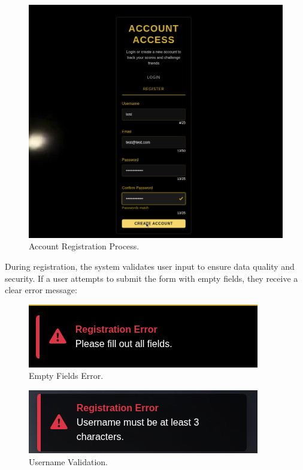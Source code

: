\begin{figure}[H]
    \centering
    \includegraphics[width=0.7\linewidth]{Figures/images/new_images/RegisteringAccount.png}
    \caption{Account Registration Process.} %
    \label{fig:registering-account}
\end{figure}

During registration, the system validates user input to ensure data quality and security. If a user attempts to submit the form with empty fields, they receive a clear error message:

\begin{figure}[H]
    \centering
    \includegraphics[width=0.6\linewidth]{Figures/images/new_images/ErrorFillOutAllTheFields.png}
    \caption{Empty Fields Error.} %
    \label{fig:error-empty-fields-wireframe}
\end{figure}

\begin{figure}[H]
    \centering
    \includegraphics[width=0.6\linewidth]{Figures/images/new_images/ErrorUserName.png}
    \caption{Username Validation.} %
    \label{fig:error-username-wireframe}
\end{figure}

